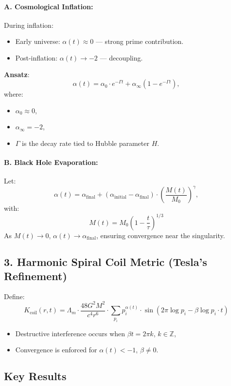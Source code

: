 \documentclass[12pt]{article}
\theoremstyle{plain}
\begin{document}
\paragraph*{A. Cosmological Inflation:}
During inflation:
\begin{itemize}
    \item Early universe: \( \alpha(t) \approx 0 \) — strong prime contribution.
    \item Post-inflation: \( \alpha(t) \to -2 \) — decoupling.
\end{itemize}

\textbf{Ansatz}:
\[
\alpha(t) = \alpha_0 \cdot e^{-\Gamma t} + \alpha_{\infty}(1 - e^{-\Gamma t}),
\]
where:
\begin{itemize}
    \item \( \alpha_0 \approx 0 \),
    \item \( \alpha_{\infty} = -2 \),
    \item \( \Gamma \) is the decay rate tied to Hubble parameter \( H \).
\end{itemize}

\paragraph*{B. Black Hole Evaporation:}
Let:
\[
\alpha(t) = \alpha_{\text{final}} + (\alpha_{\text{initial}} - \alpha_{\text{final}}) \cdot \left( \frac{M(t)}{M_0} \right)^\gamma,
\]
with:
\[
M(t) = M_0 \left(1 - \frac{t}{\tau} \right)^{1/3}
\]
As \( M(t) \to 0 \), \( \alpha(t) \to \alpha_{\text{final}} \), ensuring convergence near the singularity.

\subsection*{3. Harmonic Spiral Coil Metric (Tesla’s Refinement)}

Define:
\[
K_{\text{coil}}(r, t) = \Lambda_m \cdot \frac{48 G^2 M^2}{c^4 r^6} \cdot \sum_{p_i} p_i^{\alpha(t)} \cdot \sin\left( 2\pi \log p_i - \beta \log p_i \cdot t \right)
\]

\begin{itemize}
    \item Destructive interference occurs when \( \beta t = 2\pi k \), \( k \in \mathbb{Z} \),
    \item Convergence is enforced for \( \alpha(t) < -1 \), \( \beta \neq 0 \).
\end{itemize}

\subsection*{Key Results}
\end{document}
